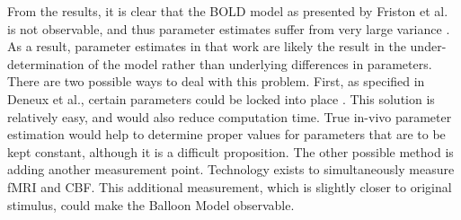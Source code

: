 \documentclass{article}
\begin{document}
From the results, it is clear that the BOLD model as presented
by Friston et al. is not observable, and thus parameter estimates
suffer from very large variance \cite{Friston2000}. As a result, parameter estimates
in that work are likely the result in the under-determination of
the model rather than underlying differences in parameters. 
There are two possible ways to deal with this problem. First, as
specified in Deneux et al., certain parameters could be locked into
place \cite{Deneux2006}. This solution is relatively easy, and would
also reduce computation time. True in-vivo parameter estimation
would help to determine proper values for parameters that are to be
kept constant, although it is a difficult proposition. The other
possible method is adding another measurement point. Technology exists
to simultaneously measure fMRI and \ac{CBF}. This additional
measurement, which is slightly closer to original stimulus, could
make the Balloon Model observable.

\small


\end{document}
